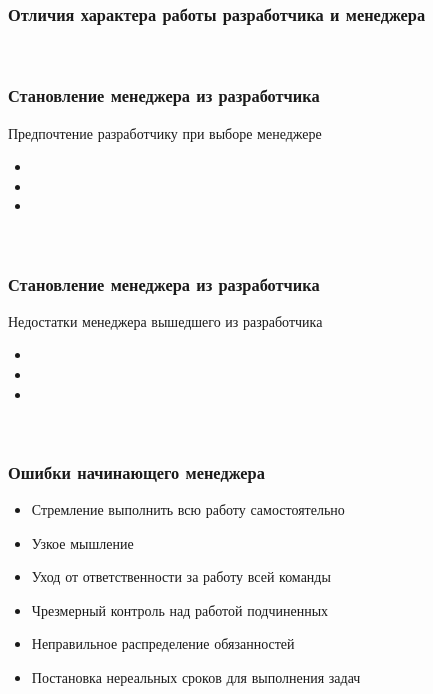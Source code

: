 \documentclass{../industrial-development}
\begin{document}
~\cite{How_to_be_a_good_IT-manager}

\begin{frame} \frametitle{Отличия характера работы разработчика и менеджера}

\end{frame}
\lecturenotes

~\cite{How_to_be_a_good_IT-manager}

\begin{frame} \frametitle{Становление менеджера из разработчика}
	\begin{block}{Предпочтение разработчику при выборе менеджере}
	 \begin{itemize}
	 	\item 
	 	\item 
	 	\item 
	 \end{itemize}
 	\end{block}
\end{frame}
\lecturenotes

~\cite{How_to_be_a_good_IT-manager}


\begin{frame} \frametitle{Становление менеджера из разработчика}
	\begin{block}{Недостатки менеджера вышедшего из разработчика}
	 \begin{itemize}
	 	\item 
	 	\item 
	 	\item 
	 \end{itemize}
 	\end{block}
\end{frame}
\lecturenotes

~\cite{How_to_be_a_good_IT-manager}

\begin{frame} \frametitle{Ошибки начинающего менеджера}
\begin{itemize}		
		\item Стремление выполнить всю работу самостоятельно
	 	\item Узкое мышление
	 	\item Уход от ответственности за работу всей команды
		\item Чрезмерный контроль над работой подчиненных
	 	\item Неправильное распределение обязанностей
	 	\item Постановка нереальных сроков для выполнения задач
 \end{itemize}
\end{frame}
\lecturenotes
\end{document}
